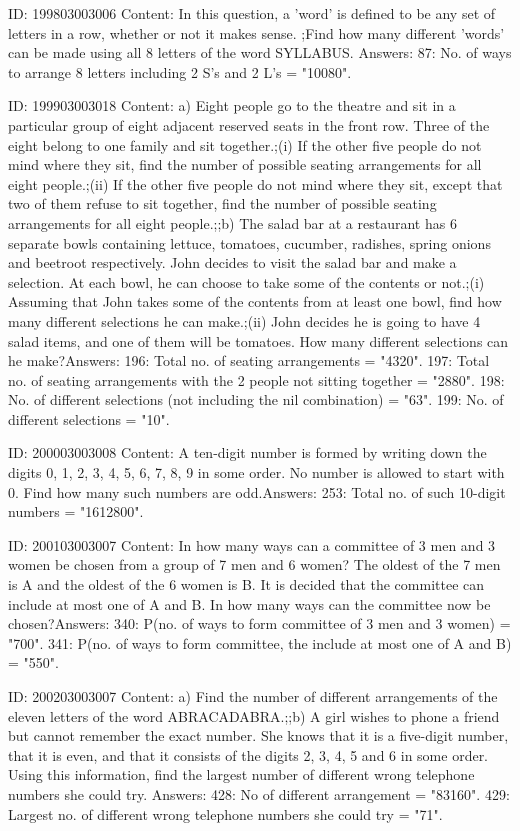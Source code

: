 \documentclass{article}
\begin{document}
ID: 199803003006
Content:
In this question, a 'word' is defined to be any set of letters in a row, whether or not it makes sense. ;Find how many different 'words' can be made using all 8 letters of the word SYLLABUS. Answers:
87: No. of ways to arrange 8 letters including 2 S's and 2 L's = "10080".

ID: 199903003018
Content:
a) Eight people go to the theatre and sit in a particular group of eight adjacent reserved seats in the front row. Three of the eight belong to one family and sit together.;(i) If the other five people do not mind where they sit, find the number of possible seating arrangements for all eight people.;(ii) If the other five people do not mind where they sit, except that two of them refuse to sit together, find the number of possible seating arrangements for all eight people.;;b) The salad bar at a restaurant has 6 separate bowls containing lettuce, tomatoes, cucumber, radishes, spring onions and beetroot respectively. John decides to visit the salad bar and make a selection. At each bowl, he can choose to take some of the contents or not.;(i) Assuming that John takes some of the contents from at least one bowl, find how many different selections he can make.;(ii) John decides he is going to have 4 salad items, and one of them will be tomatoes. How many different selections can he make?Answers:
196: Total no. of seating arrangements = "4320".
197: Total no. of seating arrangements with the 2 people not sitting together = "2880".
198: No. of different selections (not including the nil combination) = "63".
199: No. of different selections = "10".

ID: 200003003008
Content:
A ten-digit number is formed by writing down the digits 0, 1, 2, 3, 4, 5, 6, 7, 8, 9 in some order. No number is allowed to start with 0. Find how many such numbers are odd.Answers:
253: Total no. of such 10-digit numbers = "1612800".

ID: 200103003007
Content:
In how many ways can a committee of 3 men and 3 women be chosen from a group of 7 men and 6 women? The oldest of the 7 men is A and the oldest of the 6 women is B. It is decided that the committee can include at most one of A and B. In how many ways can the committee now be chosen?Answers:
340: P(no. of ways to form committee of 3 men and 3 women) = "700".
341: P(no. of ways to form committee, the include at most one of A and B) = "550".

ID: 200203003007
Content:
a)  Find the number of different arrangements of the eleven letters of the word ABRACADABRA.;;b) A girl wishes to phone a friend but cannot remember the exact number. She knows that it is a five-digit number, that it is even, and that it consists of the digits 2, 3, 4, 5 and 6 in some order. Using this information, find   the largest number of different wrong telephone numbers she could try. Answers:
428: No of different arrangement = "83160".
429: Largest no. of different wrong telephone numbers she could try = "71".
\end{document}

